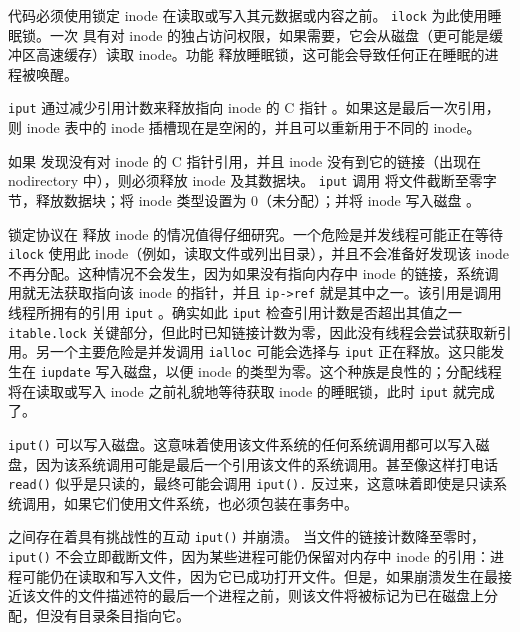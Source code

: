 \documentclass[UTF8]{article}
\begin{document}
代码必须使用锁定 inode
        在读取或写入其元数据或内容之前。
    \lstinline{ilock}   
        为此使用睡眠锁。一次
        具有对 inode 的独占访问权限，如果需要，它会从磁盘（更可能是缓冲区高速缓存）读取 inode。功能
        释放睡眠锁，这可能会导致任何正在睡眠的进程被唤醒。  

   \lstinline{iput}   
        通过减少引用计数来释放指向 inode 的 C 指针
        。如果这是最后一次引用，则 inode 表中的 inode 插槽现在是空闲的，并且可以重新用于不同的 inode。  

如果
        发现没有对 inode 的 C 指针引用，并且 inode 没有到它的链接（出现在 nodirectory 中），则必须释放 inode 及其数据块。
    \lstinline{iput}    调用
        将文件截断至零字节，释放数据块；将 inode 类型设置为 0（未分配）；并将 inode 写入磁盘
        。  

锁定协议在
        释放 inode 的情况值得仔细研究。一个危险是并发线程可能正在等待
    \lstinline{ilock}    使用此 inode（例如，读取文件或列出目录），并且不会准备好发现该 inode 不再分配。这种情况不会发生，因为如果没有指向内存中 inode 的链接，系统调用就无法获取指向该 inode 的指针，并且
    \lstinline{ip->ref}    就是其中之一。该引用是调用线程所拥有的引用
    \lstinline{iput}    。确实如此
    \lstinline{iput}    检查引用计数是否超出其值之一
    \lstinline{itable.lock}    关键部分，但此时已知链接计数为零，因此没有线程会尝试获取新引用。另一个主要危险是并发调用
    \lstinline{ialloc}    可能会选择与
    \lstinline{iput}    正在释放。这只能发生在
    \lstinline{iupdate}    写入磁盘，以便 inode 的类型为零。这个种族是良性的；分配线程将在读取或写入 inode 之前礼貌地等待获取 inode 的睡眠锁，此时
    \lstinline{iput}    就完成了。  

   \lstinline{iput()}    可以写入磁盘。这意味着使用该文件系统的任何系统调用都可以写入磁盘，因为该系统调用可能是最后一个引用该文件的系统调用。甚至像这样打电话
    \lstinline{read()}    似乎是只读的，最终可能会调用
    \lstinline{iput().}    反过来，这意味着即使是只读系统调用，如果它们使用文件系统，也必须包装在事务中。  

之间存在着具有挑战性的互动
    \lstinline{iput()}    并崩溃。
 当文件的链接计数降至零时，   \lstinline{iput()}    不会立即截断文件，因为某些进程可能仍保留对内存中 inode 的引用：进程可能仍在读取和写入文件，因为它已成功打开文件。但是，如果崩溃发生在最接近该文件的文件描述符的最后一个进程之前，则该文件将被标记为已在磁盘上分配，但没有目录条目指向它。  
\end{document}
